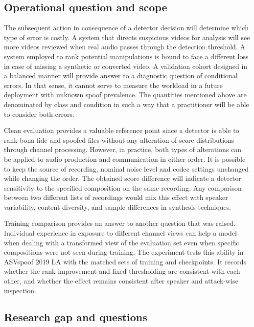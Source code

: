 \subsection{Operational question and scope}

The subsequent action in consequence of a detector decision will determine which type of error is costly. A system that directs suspicious videos for analysis will see more videos reviewed when real audio passes through the detection threshold. A system employed to rank potential manipulations is bound to face a different loss in case of missing a synthetic or converted video. A validation cohort designed in a balanced manner will provide answer to a diagnostic question of conditional errors. In that sense, it cannot serve to measure the workload in a future deployment with unknown spoof prevalence. The quantities mentioned above are denominated by class and condition in such a way that a practitioner will be able to consider both errors.

Clean evaluation provides a valuable reference point since a detector is able to rank bona fide and spoofed files without any alteration of score distributions through channel processing. However, in practice, both types of alterations can be applied to audio production and communication in either order. It is possible to keep the source of recording, nominal noise level and codec settings unchanged while changing the order. The obtained score difference will indicate a detector sensitivity to the specified composition on the same recording. Any comparison between two different lists of recordings would mix this effect with speaker variability, content diversity, and sample differences in synthesis techniques.

Training comparison provides an answer to another question that was raised. Individual experience in exposure to different channel views can help a model when dealing with a transformed view of the evaluation set even when specific compositions were not seen during training. The experiment tests this ability in ASVspoof 2019 LA with the matched sets of training and checkpoints. It records whether the rank improvement and fixed thresholding are consistent with each other, and whether the effect remains consistent after speaker and attack-wise inspection.

\subsection{Research gap and questions}


